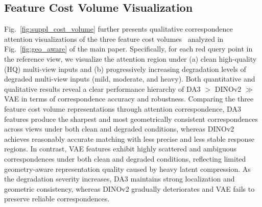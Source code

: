 \subsection{Feature Cost Volume Visualization}
Fig.~\ref{fig:suppl_cost_volume} further presents qualitative correspondence attention visualizations of the three feature cost volumes~\cite{kingma2013auto, oquab2023dinov2, depthanything3} analyzed in Fig.~\ref{fig:geo_aware} of the main paper. Specifically, for each red query point in the reference view, we visualize the attention region under (a) clean high-quality (HQ) multi-view inputs and (b) progressively increasing degradation levels of degraded multi-view inputs (mild, moderate, and heavy). Both quantitative and qualitative results reveal a clear performance hierarchy of DA3 $>$ DINOv2 $\gg$ VAE in terms of correspondence accuracy and robustness. Comparing the three feature cost volume representations through attention correspondence, DA3 features produce the sharpest and most geometrically consistent correspondences across views under both clean and degraded conditions, whereas DINOv2 achieves reasonably accurate matching with less precise and less stable response regions. In contrast, VAE features exhibit highly scattered and ambiguous correspondences under both clean and degraded conditions, reflecting limited geometry-aware representation quality caused by heavy latent compression. As the degradation severity increases, DA3 maintains strong localization and geometric consistency, whereas DINOv2 gradually deteriorates and VAE fails to preserve reliable correspondences.




